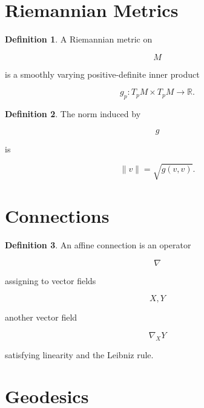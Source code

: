 \documentclass[11pt]{book}
\numberwithin{equation}{chapter}
\theoremstyle{definition}
\newtheorem{definition}{Definition}[chapter]
\theoremstyle{plain}
\begin{document}

\section{Riemannian Metrics}

\begin{definition}

A Riemannian metric on

\[
M
\]

is a smoothly varying positive-definite inner product

\[
g_p
:
T_pM
\times
T_pM
\rightarrow
\mathbb R.
\]

\end{definition}


\begin{definition}

The norm induced by

\[
g
\]

is

\[
\|v\|
=
\sqrt{g(v,v)}.
\]

\end{definition}


\section{Connections}

\begin{definition}

An affine connection is an operator

\[
\nabla
\]

assigning to vector fields

\[
X,Y
\]

another vector field

\[
\nabla_XY
\]

satisfying linearity and the Leibniz rule.

\end{definition}


\section{Geodesics}
\end{document}
